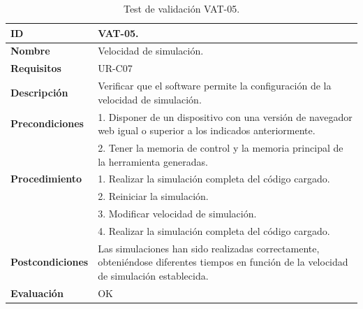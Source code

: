 \begin{center}
\begin{table}[htb]
\centering
\begin{tabular}{@{}p{2.5cm} p{9cm}@{}} 
\toprule
\textbf{ID} 					& VAT-05. \\
\midrule
\textbf{Nombre} 				& Velocidad de simulación. \\
\midrule
\textbf{Requisitos} 		& UR-C07\\
\midrule
\textbf{Descripción} 		& Verificar que el software permite la configuración de la velocidad de simulación. \\
\midrule
\textbf{Precondiciones}		& 1. Disponer de un dispositivo con una versión de navegador web igual o superior a los indicados anteriormente. \\
											& 2. Tener la memoria de control y la memoria principal de la herramienta generadas. \\
\midrule
\textbf{Procedimiento}		& 1. Realizar la simulación completa del código cargado.\\
											& 2. Reiniciar la simulación.\\
											& 3. Modificar velocidad de simulación. \\
											& 4. Realizar la simulación completa del código cargado.\\
\midrule
\textbf{Postcondiciones} 		&  Las simulaciones han sido realizadas correctamente, obteniéndose diferentes tiempos en función de la velocidad de simulación establecida.\\
\midrule
\textbf{Evaluación} 			& OK \\
\bottomrule
\end{tabular}
\caption{Test de validación VAT-05.}
\label{tab:vat-05}
\end{table}
\end{center}

